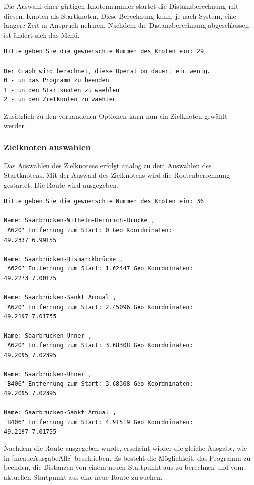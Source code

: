 \documentclass[12pt, a4paper, ngerman]{article}
\begin{document}
Die Auswahl einer gültigen Knotennummer startet die Distanzberechnung mit diesem Knoten als Startknoten. Diese Berechnung kann, je nach System, eine längere Zeit in Anspruch nehmen. Nachdem die Distanzberechnung abgeschlossen ist ändert sich das Menü.
\begin{lstlisting}[label=menueAusgabeAlle]
Bitte geben Sie die gewuenschte Nummer des Knoten ein: 29

Der Graph wird berechnet, diese Operation dauert ein wenig.
0 - um das Programm zu beenden
1 - um den Startknoten zu waehlen
2 - um den Zielknoten zu waehlen
\end{lstlisting}

Zusätzlich zu den vorhandenen Optionen kann nun ein Zielknoten gewählt werden.

\subsubsection{Zielknoten auswählen}
Das Auswählen des Zielknotens erfolgt analog zu dem Auswählen des Startknotens. Mit der Auswahl des Zielknotens wird die Routenberechnung gestartet. Die Route wird ausgegeben.
\begin{lstlisting}
Bitte geben Sie die gewuenschte Nummer des Knoten ein: 36

Name: Saarbrücken-Wilhelm-Heinrich-Brücke , 
"A620" Entfernung zum Start: 0 Geo Koordninaten: 
49.2337 6.99155

Name: Saarbrücken-Bismarckbrücke , 
"A620" Entfernung zum Start: 1.02447 Geo Koordninaten: 
49.2273 7.00175

Name: Saarbrücken-Sankt Arnual , 
"A620" Entfernung zum Start: 2.45096 Geo Koordninaten: 
49.2197 7.01755

Name: Saarbrücken-Unner , 
"A620" Entfernung zum Start: 3.68308 Geo Koordninaten: 
49.2095 7.02395

Name: Saarbrücken-Unner , 
"B406" Entfernung zum Start: 3.68308 Geo Koordninaten: 
49.2095 7.02395

Name: Saarbrücken-Sankt Arnual , 
"B406" Entfernung zum Start: 4.91519 Geo Koordninaten: 
49.2197 7.01755
\end{lstlisting}

Nachdem die Route ausgegeben wurde, erscheint wieder die gleiche Ausgabe, wie in \ref{menueAusgabeAlle} beschrieben. Es besteht die Möglichkeit, das Programm zu beenden, die Distanzen von einem neuen Startpunkt aus zu berechnen und vom aktuellen Startpunkt aus eine neue Route zu suchen.
\end{document}
